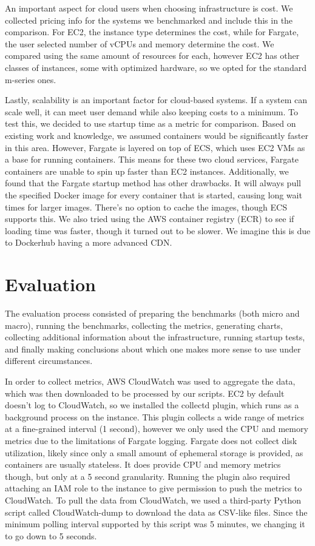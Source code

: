 \documentclass[11pt]{article}
\begin{document}
An important aspect for cloud users when choosing infrastructure is cost. We collected pricing info for the systems we benchmarked and include this in the comparison. For EC2, the instance type determines the cost, while for Fargate, the user selected number of vCPUs and memory determine the cost. We compared using the same amount of resources for each, however EC2 has other classes of instances, some with optimized hardware, so we opted for the standard m-series ones.

Lastly, scalability is an important factor for cloud-based systems. If a system can scale well, it can meet user demand while also keeping costs to a minimum. To test this, we decided to use startup time as a metric for comparison. Based on existing work and knowledge, we assumed containers would be significantly faster in this area. However, Fargate is layered on top of ECS, which uses EC2 VMs as a base for running containers. This means for these two cloud services, Fargate containers are unable to spin up faster than EC2 instances. Additionally, we found that the Fargate startup method has other drawbacks. It will always pull the specified Docker image for every container that is started, causing long wait times for larger images. There's no option to cache the images, though ECS supports this. We also tried using the AWS container registry (ECR) to see if loading time was faster, though it turned out to be slower. We imagine this is due to Dockerhub having a more advanced CDN.


\section{Evaluation}

The evaluation process consisted of preparing the benchmarks (both micro and macro), running the benchmarks, collecting the metrics, generating charts, collecting additional information about the infrastructure, running startup tests, and finally making conclusions about which one makes more sense to use under different circumstances.

In order to collect metrics, AWS CloudWatch was used to aggregate the data, which was then downloaded to be processed by our scripts. EC2 by default doesn't log to CloudWatch, so we installed the collectd plugin, which runs as a background process on the instance. This plugin collects a wide range of metrics at a fine-grained interval (1 second), however we only used the CPU and memory metrics due to the limitations of Fargate logging. Fargate does not collect disk utilization, likely since only a small amount of ephemeral storage is provided, as containers are usually stateless. It does provide CPU and memory metrics though, but only at a 5 second granularity. Running the plugin also required attaching an IAM role to the instance to give permission to push the metrics to CloudWatch. To pull the data from CloudWatch, we used a third-party Python script called CloudWatch-dump to download the data as CSV-like files. Since the minimum polling interval supported by this script was 5 minutes, we changing it to go down to 5 seconds.
\end{document}
